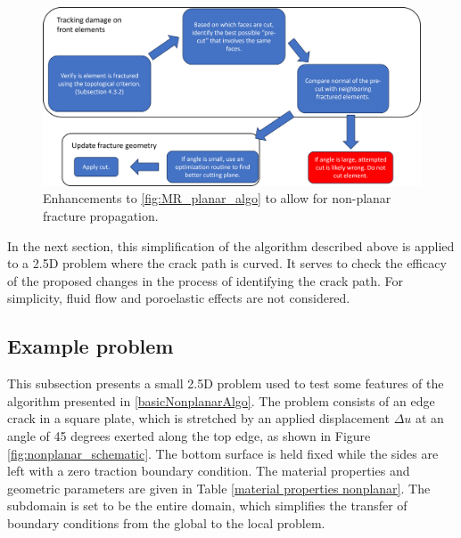 \begin{figure}[h]
    \centering
    \includegraphics[width=\linewidth]{Chapter4/figures/nonplanar/nonplanar_algo.png}
    \caption{Enhancements to \ref{fig:MR_planar_algo} to allow for non-planar fracture propagation.}
    \label{fig:nonplanar_algo}
\end{figure}


In the next section, this simplification of the algorithm described above is applied to a 2.5D problem where the crack path is curved. It serves to check the efficacy of the proposed changes in the process of identifying the crack path. For simplicity, fluid flow and poroelastic effects are not considered.

\subsection{Example problem}

This subsection presents a small 2.5D problem used to test some features of the algorithm presented in \ref{basicNonplanarAlgo}. The problem consists of an edge crack in a square plate, which is stretched by an applied displacement  $\Delta u$ at an angle of 45 degrees exerted along the top edge, as shown in Figure \ref{fig:nonplanar_schematic}. The bottom surface is held fixed while the sides are left with a zero traction boundary condition. The material properties and geometric parameters are given in Table \ref{material properties nonplanar}. 
The subdomain is set to be the entire domain, which simplifies the transfer of boundary conditions from the global to the local problem. 

